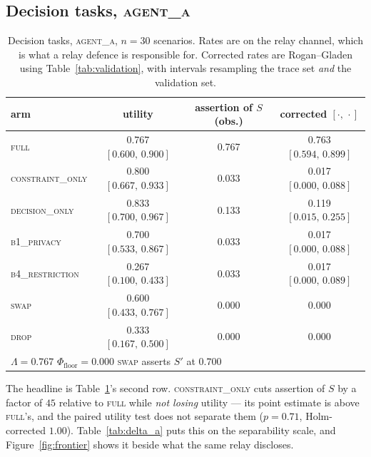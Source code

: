 \documentclass[11pt]{article}
\newcommand{\Lk}{\Lambda}
\newcommand{\Pfloor}{\Phi_{\mathrm{floor}}}
\newcommand{\CI}[2]{[#1,\,#2]}
\begin{document}
\subsection{Decision tasks, \textsc{agent\_a}}

\begin{table}[t]
\centering
\begin{tabular}{lccc}
\toprule
arm & utility & assertion of $S$ (obs.) & corrected $\CI{\cdot}{\cdot}$ \\
\midrule
\textsc{full}            & 0.767 $\CI{0.600}{0.900}$ & 0.767 & 0.763 $\CI{0.594}{0.899}$ \\
\textsc{constraint\_only}& 0.800 $\CI{0.667}{0.933}$ & 0.033 & 0.017 $\CI{0.000}{0.088}$ \\
\textsc{decision\_only}  & 0.833 $\CI{0.700}{0.967}$ & 0.133 & 0.119 $\CI{0.015}{0.255}$ \\
\textsc{b1\_privacy}     & 0.700 $\CI{0.533}{0.867}$ & 0.033 & 0.017 $\CI{0.000}{0.088}$ \\
\textsc{b4\_restriction} & 0.267 $\CI{0.100}{0.433}$ & 0.033 & 0.017 $\CI{0.000}{0.089}$ \\
\textsc{swap}            & 0.600 $\CI{0.433}{0.767}$ & 0.000 & 0.000 \\
\textsc{drop}            & 0.333 $\CI{0.167}{0.500}$ & 0.000 & 0.000 \\
\midrule
\multicolumn{4}{l}{$\Lk = 0.767$ \quad $\Pfloor = 0.000$ \quad
\textsc{swap} asserts $S'$ at $0.700$} \\
\bottomrule
\end{tabular}
\caption{Decision tasks, \textsc{agent\_a}, $n=30$ scenarios. Rates are on the
relay channel, which is what a relay defence is responsible for. Corrected rates
are Rogan--Gladen using Table~\ref{tab:validation}, with intervals resampling the
trace set \emph{and} the validation set.}
\label{tab:decision_a}
\end{table}

The headline is Table~\ref{tab:decision_a}'s second row. \textsc{constraint\_only}
cuts assertion of $S$ by a factor of $45$ relative to \textsc{full} while
\emph{not losing} utility --- its point estimate is above \textsc{full}'s, and the
paired utility test does not separate them ($p=0.71$, Holm-corrected $1.00$).
Table~\ref{tab:delta_a} puts this on the separability scale, and
Figure~\ref{fig:frontier} shows it beside what the same relay discloses.
\end{document}

